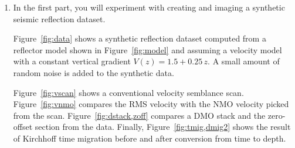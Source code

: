 \begin{enumerate}
\item In the first part, you will experiment with creating and 
  imaging a synthetic seismic reflection dataset.



Figure~\ref{fig:data} shows a synthetic reflection dataset computed
from a reflector model shown in Figure~\ref{fig:model} and assuming a
velocity model with a constant vertical gradient $V(z) = 1.5 +
0.25\,z$. A small amount of random noise is added to the synthetic data.

Figure~\ref{fig:vscan} shows a conventional velocity semblance
scan. Figure~\ref{fig:vnmo} compares the RMS velocity with the NMO
velocity picked from the scan. Figure~\ref{fig:dstack,zoff} compares a
DMO stack and the zero-offset section from the data. Finally,
Figure~\ref{fig:tmig,dmig2} shows the result of Kirchhoff time
migration before and after conversion from time to depth.


\end{enumerate}
